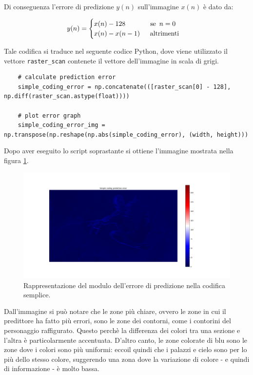 \noindent Di conseguenza l'errore di predizione $y(n)$ sull'immagine $x(n)$ è dato da:

\begin{gather*}
    y(n) = 
    \begin{cases}
        x(n) - 128 \hspace{37px} \text{se } \, n = 0 \\
        x(n) - x(n - 1) \hspace{15px} \text{altrimenti}\\
    \end{cases}
\end{gather*}

\noindent Tale codifica si traduce nel seguente codice Python, dove viene utilizzato il vettore \texttt{raster\_scan} contenete il vettore dell'immagine in scala di grigi.

\begin{lstlisting}
    # calculate prediction error
    simple_coding_error = np.concatenate(([raster_scan[0] - 128], np.diff(raster_scan.astype(float))))

    # plot error graph
    simple_coding_error_img = np.transpose(np.reshape(np.abs(simple_coding_error), (width, height)))

\end{lstlisting}

\noindent Dopo aver eseguito lo script soprastante si ottiene l'immagine mostrata nella figura \ref{fig:simple-coding}.
\begin{figure}[h]
    \centering
    \includegraphics[width = .9\textwidth]{hw-1/report/imgs/simple-coding.png}
    \caption{Rappresentazione del modulo dell'errore di predizione nella codifica semplice.}
    \label{fig:simple-coding}
\end{figure}
Dall'immagine si può notare che le zone più chiare, ovvero le zone in cui il predittore ha fatto più errori, sono le zone dei contorni, come i contorini del personaggio raffigurato. Questo perchè la differenza dei colori tra una sezione e l'altra è particolarmente accentuata. D'altro canto, le zone colorate di blu sono le zone dove i colori sono più uniformi: eccoil quindi che i palazzi e  cielo sono per lo più dello stesso colore, suggerendo una zona dove la variazione di colore - e quindi di informazione - è molto bassa.



